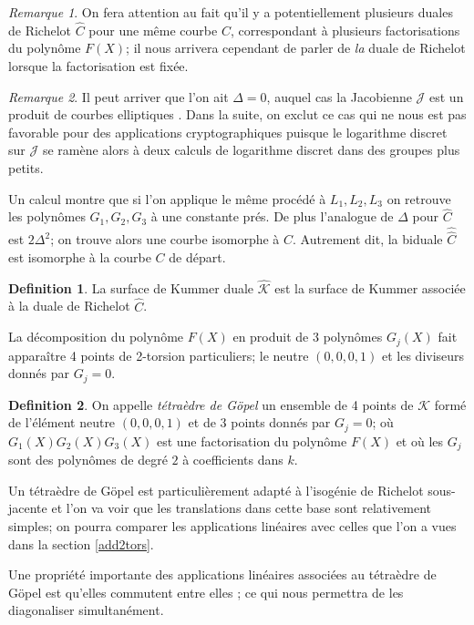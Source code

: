 \documentclass[a4paper,12pt]{article}
\theoremstyle{definition}
\newtheorem{definition}{Definition}[section]
\theoremstyle{remark}
\newtheorem{remarque}{Remarque}
\numberwithin{equation}{section}
\begin{document}
\begin{remarque}
On fera attention au fait qu'il y a potentiellement plusieurs duales de Richelot $\hat{C}$ pour une même courbe $C$, correspondant à plusieurs factorisations du polynôme $F(X)$; il nous arrivera cependant de parler de \emph{la} duale de Richelot lorsque la factorisation est fixée.
\end{remarque}

\begin{remarque}
Il peut arriver que l'on ait $\Delta = 0$, auquel cas la Jacobienne $\mathcal{J}$ est un produit de courbes elliptiques \citep{cassels-Flynn}. Dans la suite, on exclut ce cas qui ne nous est pas favorable pour des applications cryptographiques puisque le logarithme discret sur $\mathcal{J}$ se ramène alors à deux calculs de logarithme discret dans des groupes plus petits.
\end{remarque}

Un calcul montre que si l'on applique le même procédé à $L_1,L_2,L_3$ on retrouve les polynômes $G_1,G_2,G_3$ à une constante prés. De plus l'analogue de $\Delta$ pour $\hat{C}$ est $2\Delta^2$; on trouve alors une courbe isomorphe à $C$. Autrement dit, la biduale $\hat{\hat{C}}$ est isomorphe à la courbe $C$ de départ.

\begin{definition}
La surface de Kummer duale $\hat{\mathcal{K}}$ est la surface de Kummer associée à la duale de Richelot $\hat{C}$.
\end{definition}

La décomposition du polynôme $F(X)$ en produit de 3 polynômes $G_j(X)$ fait apparaître 4 points de 2-torsion particuliers; le neutre $(0,0,0,1)$ et les diviseurs donnés par $G_j=0$.

\begin{definition}
On appelle \emph{tétraèdre de G\"opel} un ensemble de 4 points de $\mathcal{K}$ formé de l'élément neutre $(0,0,0,1)$ et de 3 points donnés par $G_j=0$; où $G_1(X)G_2(X)G_3(X)$ est une factorisation du polynôme $F(X)$ et où les $G_j$ sont des polynômes de degré $2$ à coefficients dans $k$.
\end{definition}

Un tétraèdre de G\"opel est particulièrement adapté à l'isogénie de Richelot sous-jacente et l'on va voir que les translations dans cette base sont relativement simples; on pourra comparer les applications linéaires avec celles que l'on a vues dans la section \ref{add2tors}.

Une propriété importante des applications linéaires associées au tétraèdre de G\"opel est qu'elles commutent entre elles \citep{cassels-Flynn}; ce qui nous permettra de les diagonaliser simultanément. 
\end{document}
